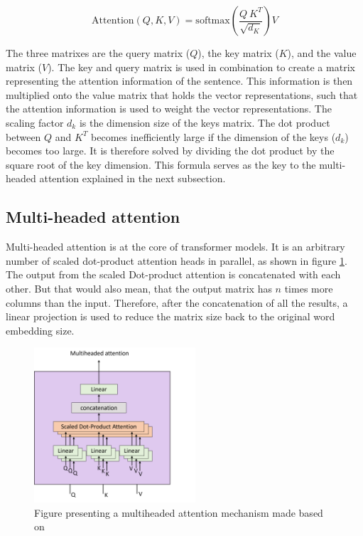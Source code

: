 $$
\text{Attention}(Q,K,V) = \text{softmax}(\frac{Q \ K^T}{\sqrt{d_K}}) V
$$

The three matrixes are the query matrix ($Q$), the key matrix ($K$), and the value matrix ($V$). The key and query matrix is used in combination to create a matrix representing the attention information of the sentence. This information is then multiplied onto the value matrix that holds the vector representations, such that the attention information is used to weight the vector representations.
The scaling factor $d_k$ is the dimension size of the keys matrix. The dot product between $Q$ and $K^T$ becomes inefficiently large if the dimension of the keys ($d_k$) becomes too large. It is therefore solved by dividing the dot product by the square root of the key dimension. This formula serves as the key to the multi-headed attention explained in the next subsection.

\subsection{Multi-headed attention} \label{sec:MHA}
Multi-headed attention is at the core of transformer models. It is an arbitrary number of scaled dot-product attention heads in parallel, as shown in figure \ref{fig:MHA}. The output from the scaled Dot-product attention is concatenated with each other. But that would also mean, that the output matrix has $n$ times more columns than the input. Therefore, after the concatenation of all the results, a linear projection is used to reduce the matrix size back to the original word embedding size.

 
\begin{figure}[ht]
    \centering
    \includegraphics[width=6cm]{img/Multi-headed_attention.png}
    \caption{Figure presenting a multiheaded attention mechanism made based on \cite{46201}}
    \label{fig:MHA}
\end{figure}



